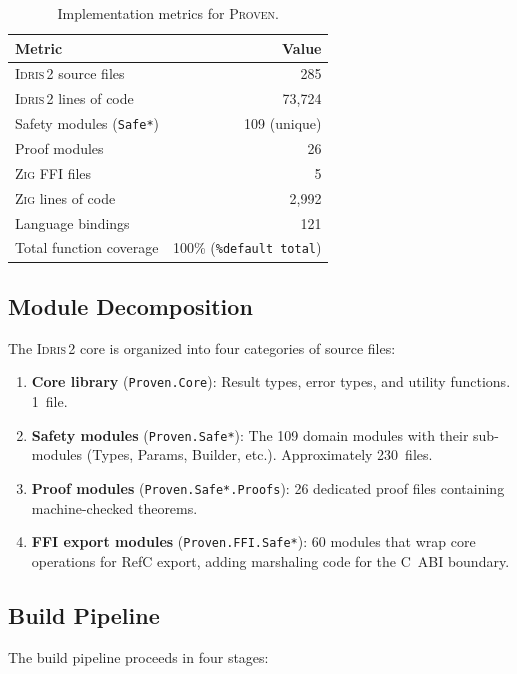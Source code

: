 \documentclass[11pt,a4paper]{article}
\newcommand{\proven}{\textsc{Proven}}
\newcommand{\idris}{\textsc{Idris\,2}}
\newcommand{\zig}{\textsc{Zig}}
\newcommand{\code}[1]{\texttt{#1}}
\begin{document}
\begin{table}[t]
\centering
\caption{Implementation metrics for \proven{}.}
\label{tab:metrics}
\begin{tabular}{@{}lr@{}}
\toprule
\textbf{Metric} & \textbf{Value} \\
\midrule
\idris{} source files & 285 \\
\idris{} lines of code & 73,724 \\
Safety modules (\code{Safe*}) & 109 (unique) \\
Proof modules & 26 \\
\zig{} FFI files & 5 \\
\zig{} lines of code & 2,992 \\
Language bindings & 121 \\
Total function coverage & 100\% (\code{\%default total}) \\
\bottomrule
\end{tabular}
\end{table}

\subsection{Module Decomposition}

The \idris{} core is organized into four categories of source files:

\begin{enumerate}[nosep]
  \item \textbf{Core library} (\code{Proven.Core}): Result types, error
    types, and utility functions. 1~file.
  \item \textbf{Safety modules} (\code{Proven.Safe*}): The 109 domain
    modules with their sub-modules (Types, Params, Builder, etc.).
    Approximately 230~files.
  \item \textbf{Proof modules} (\code{Proven.Safe*.Proofs}): 26 dedicated
    proof files containing machine-checked theorems.
  \item \textbf{FFI export modules} (\code{Proven.FFI.Safe*}): 60 modules
    that wrap core operations for RefC export, adding marshaling code for
    the C~ABI boundary.
\end{enumerate}

\subsection{Build Pipeline}

The build pipeline proceeds in four stages:
\end{document}
